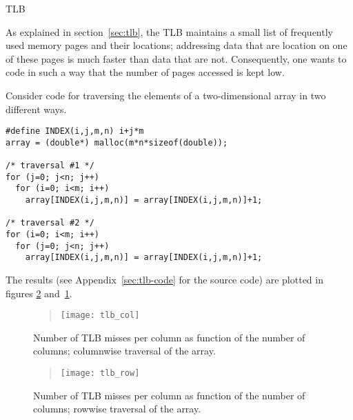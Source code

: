  {TLB}
\label{sec:coding-tlb}

As explained in section~\ref{sec:tlb}, the \acf{TLB} maintains a small
list of frequently used memory pages and their locations; addressing
data that are location on one of these pages is much faster than data
that are not. Consequently, one wants to code in such a way that the
number of pages accessed is kept low.

Consider code for traversing the elements of a two-dimensional array
in two different ways.
\begin{lstlisting}
#define INDEX(i,j,m,n) i+j*m
array = (double*) malloc(m*n*sizeof(double));

/* traversal #1 */
for (j=0; j<n; j++)
  for (i=0; i<m; i++)
    array[INDEX(i,j,m,n)] = array[INDEX(i,j,m,n)]+1;

/* traversal #2 */
for (i=0; i<m; i++)
  for (j=0; j<n; j++)
    array[INDEX(i,j,m,n)] = array[INDEX(i,j,m,n)]+1;
\end{lstlisting}

The results (see Appendix~\ref{sec:tlb-code} for the source code) are
plotted in figures \ref{fig:tlb_row} and~\ref{fig:tlb_col}. 

\begin{figure}[ht]
  \begin{quote}
  \texttt{[image: tlb\_col]}
  \end{quote}
  \caption{Number of TLB misses per column as function of the number
    of columns; columnwise traversal of the array.}
  \label{fig:tlb_col}
\end{figure}
\begin{figure}[ht]
  \begin{quote}
  \texttt{[image: tlb\_row]}
  \end{quote}
  \caption{Number of TLB misses per column as function of the number
    of columns; rowwise traversal of the array.}
  \label{fig:tlb_row}
\end{figure}

